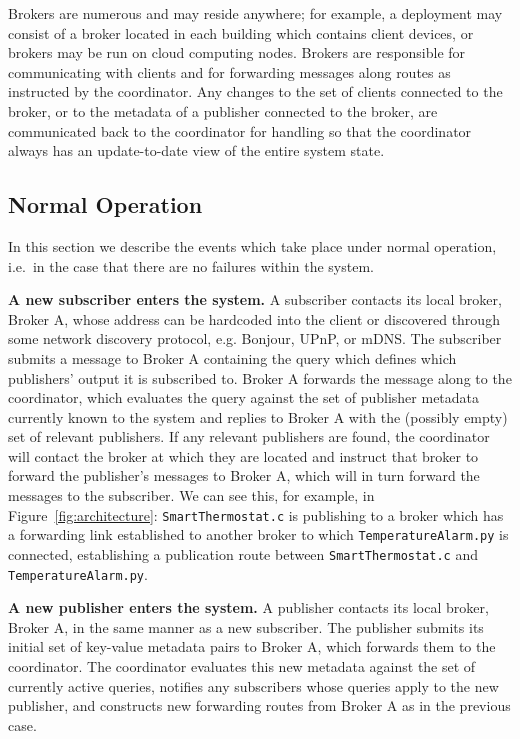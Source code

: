 Brokers are numerous and may reside anywhere; for example, a deployment may consist of a broker located in each building which contains client devices, or brokers may be run on cloud computing nodes.
Brokers are responsible for communicating with clients and for forwarding messages along routes as instructed by the coordinator.
Any changes to the set of clients connected to the broker, or to the metadata of a publisher connected to the broker, are communicated back to the coordinator for handling so that the coordinator always has an update-to-date view of the entire system state.

\subsection{Normal Operation}
\label{subsec:normal_operation}

In this section we describe the events which take place under normal operation, i.e.\ in the case that there are no failures within the system.

\textbf{A new subscriber enters the system.}
A subscriber contacts its local broker, Broker A, whose address can be hardcoded into the client or discovered through some network discovery protocol, e.g. Bonjour, UPnP, or mDNS\@.
The subscriber submits a message to Broker A containing the query which defines which publishers' output it is subscribed to.
Broker A forwards the message along to the coordinator, which evaluates the query against the set of publisher metadata currently known to the system and replies to Broker A with the (possibly empty) set of relevant publishers.
If any relevant publishers are found, the coordinator will contact the broker at which they are located and instruct that broker to forward the publisher's messages to Broker A, which will in turn forward the messages to the subscriber.
We can see this, for example, in Figure~\ref{fig:architecture}: \texttt{SmartThermostat.c} is publishing to a broker which has a forwarding link established to another broker to which \texttt{TemperatureAlarm.py} is connected, establishing a publication route between \texttt{SmartThermostat.c} and \texttt{TemperatureAlarm.py}.

\textbf{A new publisher enters the system.}
A publisher contacts its local broker, Broker A, in the same manner as a new subscriber.
The publisher submits its initial set of key-value metadata pairs to Broker A, which forwards them to the coordinator.
The coordinator evaluates this new metadata against the set of currently active queries, notifies any subscribers whose queries apply to the new publisher, and constructs new forwarding routes from Broker A as in the previous case.

